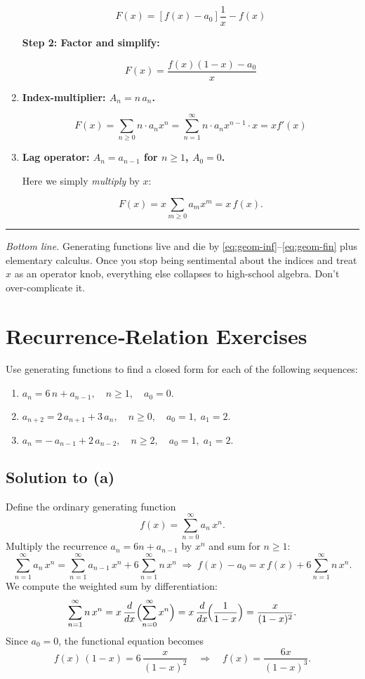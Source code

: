 \documentclass[docmute]{article}
\begin{document}
\begin{enumerate}[label=\textbf{2(\alph*)}\quad]
\[
F(x) = \left[ f(x) - a_0 \right] \frac{1}{x} - f(x)
\]

\textbf{Step 2: Factor and simplify:}

\[
F(x) = \frac{f(x)(1 - x) - a_0}{x}
\]

\medskip\item \textbf{Index-multiplier: $A_{n}=n\,a_{n}$.}

\[
F(x) = \sum_{n \geq 0} n \cdot a_n x^n = \sum_{n=1}^{\infty} n \cdot a_n x^{n-1} \cdot x = x f'(x)
\]


\medskip\item \textbf{Lag operator: $A_{n}=a_{n-1}$ for $n\ge1$, $A_{0}=0$.}

Here we simply \emph{multiply} by $x$:

\[
   F(x)=x\sum_{m\ge0}a_{m}x^{m}=x\,f(x).
\]


\end{enumerate}

\bigskip
\hrule
\bigskip

\noindent
\emph{Bottom line.}  Generating functions live and die by
\eqref{eq:geom-inf}–\eqref{eq:geom-fin} plus elementary calculus.  Once you stop
being sentimental about the indices and treat $x$ as an operator knob,
everything else collapses to high-school algebra.  Don’t over-complicate it.


\section*{Recurrence‐Relation Exercises}

Use generating functions to find a closed form for each of the following sequences:
\begin{enumerate}[label=\textbf{(\alph*)}]
  \item $a_n = 6\,n + a_{n-1},\quad n\ge1,\quad a_0=0.$
  \item $a_{n+2} = 2\,a_{n+1} + 3\,a_n,\quad n\ge0,\quad a_0=1,\;a_1=2.$
  \item $a_n = -\,a_{n-1} + 2\,a_{n-2},\quad n\ge2,\quad a_0=1,\;a_1=2.$
\end{enumerate}


\subsection*{Solution to (a)}
Define the ordinary generating function
\[
f(x)=\sum_{n=0}^\infty a_n\,x^n.
\]
Multiply the recurrence \(a_n = 6n + a_{n-1}\) by \(x^n\) and sum for \(n\ge1\):
\[
\sum_{n=1}^\infty a_n\,x^n
= \sum_{n=1}^\infty a_{n-1}\,x^n
  + 6\sum_{n=1}^\infty n\,x^n
\;\Longrightarrow\;
f(x)-a_0 = x\,f(x) + 6\sum_{n=1}^\infty n\,x^n.
\]
We compute the weighted sum by differentiation:
\[
\sum_{n=1}^\infty n\,x^n
= x\,\frac{d}{dx}\Bigl(\sum_{n=0}^\infty x^n\Bigr)
= x\,\frac{d}{dx}\!\Bigl(\frac1{1-x}\Bigr)
= \frac{x}{(1-x)^2}.
\]
Since \(a_0=0\), the functional equation becomes
\[
f(x)\,(1 - x)
= 6\,\frac{x}{(1-x)^2}
\quad\Longrightarrow\quad
f(x) = \frac{6x}{(1-x)^3}.
\]
\end{document}
